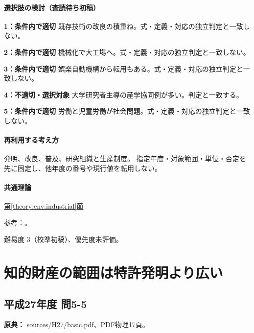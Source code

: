 \paragraph{選択肢の検討（査読待ち初稿）}\mbox{}\par

\noindent\textbf{1：条件内で適切} 既存技術の改良の積重ね。式・定義・対応の独立判定と一致しない。\par

\noindent\textbf{2：条件内で適切} 機械化で大工場へ。式・定義・対応の独立判定と一致しない。\par

\noindent\textbf{3：条件内で適切} 娯楽自動機構から転用もある。式・定義・対応の独立判定と一致しない。\par

\noindent\textbf{4：不適切・選択対象} 大学研究者主導の産学協同例が多い。判定と一致する。\par

\noindent\textbf{5：条件内で適切} 労働と児童労働が社会問題。式・定義・対応の独立判定と一致しない。\par

\paragraph{再利用する考え方} 発明、改良、普及、研究組織と生産制度。 指定年度・対象範囲・単位・否定を先に固定し、他年度の番号や現行値を転用しない。

\paragraph{共通理論} \hyperref[theory:env:industrial]{第\ref*{theory:env:industrial}節}

\par 参考：\cite{env58_steam}。

\par 難易度 3（校準初稿）、優先度未評価。

\section{知的財産の範囲は特許発明より広い}

\subsection{平成27年度 問5-5}
\label{q:h27-reg-basic-5-5}

\noindent\textbf{原典：} sources/H27/basic.pdf、PDF物理17頁。

